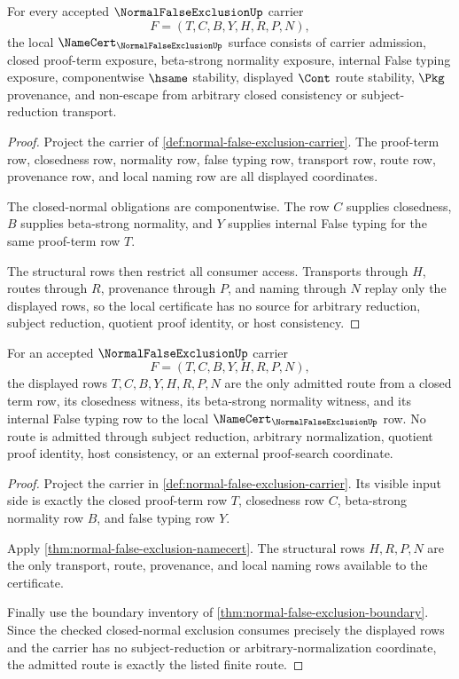 \begin{theorem}
\label{thm:normal-false-exclusion-namecert}
For every accepted $\NormalFalseExclusionUp$ carrier
$$
F=(T,C,B,Y,H,R,P,N),
$$
the local $\NameCert_{\NormalFalseExclusionUp}$ surface consists of carrier admission, closed proof-term exposure, beta-strong normality exposure, internal False typing exposure, componentwise $\hsame$ stability, displayed $\Cont$ route stability, $\Pkg$ provenance, and non-escape from arbitrary closed consistency or subject-reduction transport.
\end{theorem}
\begin{proof}
Project the carrier of \autoref{def:normal-false-exclusion-carrier}. The proof-term row, closedness row, normality row, false typing row, transport row, route row, provenance row, and local naming row are all displayed coordinates.

The closed-normal obligations are componentwise. The row $C$ supplies closedness, $B$ supplies beta-strong normality, and $Y$ supplies internal False typing for the same proof-term row $T$.

The structural rows then restrict all consumer access. Transports through $H$, routes through $R$, provenance through $P$, and naming through $N$ replay only the displayed rows, so the local certificate has no source for arbitrary reduction, subject reduction, quotient proof identity, or host consistency.
\end{proof}

\begin{theorem}
\label{thm:normal-false-exclusion-displayed-route-admission}
For an accepted $\NormalFalseExclusionUp$ carrier
$$
F=(T,C,B,Y,H,R,P,N),
$$
the displayed rows $T,C,B,Y,H,R,P,N$ are the only admitted route from a closed term row, its closedness witness, its beta-strong normality witness, and its internal False typing row to the local $\NameCert_{\NormalFalseExclusionUp}$ row. No route is admitted through subject reduction, arbitrary normalization, quotient proof identity, host consistency, or an external proof-search coordinate.
\end{theorem}
\begin{proof}
Project the carrier in \autoref{def:normal-false-exclusion-carrier}. Its visible input side is exactly the closed proof-term row $T$, closedness row $C$, beta-strong normality row $B$, and false typing row $Y$.

Apply \autoref{thm:normal-false-exclusion-namecert}. The structural rows $H,R,P,N$ are the only transport, route, provenance, and local naming rows available to the certificate.

Finally use the boundary inventory of \autoref{thm:normal-false-exclusion-boundary}. Since the checked closed-normal exclusion consumes precisely the displayed rows and the carrier has no subject-reduction or arbitrary-normalization coordinate, the admitted route is exactly the listed finite route.
\end{proof}

